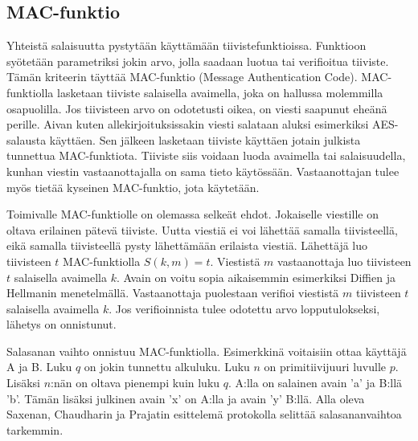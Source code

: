 \documentclass[finnish]{tktltiki2}
\theoremstyle{definition}
\theoremstyle{remark}
\begin{document}
\subsection{MAC-funktio}

Yhteistä salaisuutta pystytään käyttämään tiivistefunktioissa. Funktioon syötetään parametriksi jokin arvo, jolla saadaan luotua tai  verifioitua tiiviste. Tämän kriteerin täyttää MAC-funktio (Message Authentication Code). MAC-funktiolla lasketaan tiiviste salaisella avaimella, joka on hallussa molemmilla osapuolilla. Jos tiivisteen arvo on odotetusti oikea, on viesti saapunut eheänä perille. Aivan kuten allekirjoituksissakin viesti salataan aluksi esimerkiksi AES-salausta käyttäen. Sen jälkeen lasketaan tiiviste käyttäen jotain julkista tunnettua MAC-funktiota. Tiiviste siis voidaan luoda avaimella tai salaisuudella, kunhan viestin vastaanottajalla on sama tieto käytössään. Vastaanottajan tulee myös tietää kyseinen MAC-funktio, jota käytetään.

Toimivalle MAC-funktiolle on olemassa selkeät ehdot. Jokaiselle viestille on oltava erilainen pätevä tiiviste. Uutta viestiä ei voi lähettää samalla tiivisteellä, eikä samalla tiivisteellä pysty lähettämään erilaista viestiä. Lähettäjä luo tiivisteen $t$ MAC-funktiolla $S(k,m) = t$. Viestistä $m$ vastaanottaja luo tiivisteen $t$  salaisella avaimella $k$. Avain on voitu sopia aikaisemmin esimerkiksi Diffien ja Hellmanin menetelmällä. Vastaanottaja puolestaan verifioi viestistä $m$ tiivisteen $t$ salaisella avaimella $k$. Jos verifioinnista tulee odotettu arvo lopputulokseksi, lähetys on onnistunut. \cite{MACA} 
 
Salasanan vaihto onnistuu MAC-funktiolla. Esimerkkinä voitaisiin ottaa käyttäjä A ja B. Luku $q$ on jokin tunnettu alkuluku. Luku $n$ on primitiivijuuri luvulle $p$. Lisäksi $n$:nän on oltava pienempi kuin luku $q$. A:lla on salainen avain 'a' ja B:llä 'b'. Tämän lisäksi julkinen avain 'x' on A:lla ja avain 'y' B:llä. Alla oleva Saxenan, Chaudharin ja Prajatin \cite{MAC} esittelemä protokolla selittää salasananvaihtoa tarkemmin.
\end{document}

